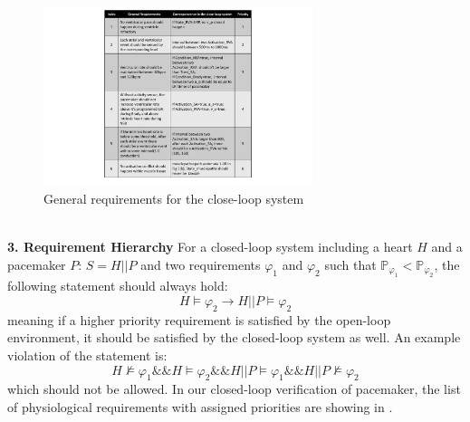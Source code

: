 \begin{figure}
	\center
	\includegraphics[width=0.7\textwidth]{figs/properties.pdf}
	\center
	\vspace{-10pt}
	\caption{General requirements for the close-loop system}
	\label{fig:properties}
\end{figure}
\noindent
\\\textbf{3. Requirement Hierarchy}
For a closed-loop system including a heart $H$ and a pacemaker $P$: $S=H || P$ and two requirements $\varphi_1$ and $\varphi_2$ such that $\mathbb{P}_{\varphi_1}<\mathbb{P}_{\varphi_2}$, the following statement should always hold:
\vspace{-5pt}
$$H\models\varphi_2\rightarrow H||P\models\varphi_2$$
\vspace{-5pt}
meaning if a higher priority requirement is satisfied by the open-loop environment, it should be satisfied by the closed-loop system as well. An example violation of the statement is:
\vspace{-5pt}
$$H\not\models\varphi_1 \&\& H\models\varphi_2 \&\& H||P\models\varphi_1 \&\& H||P\not\models\varphi_2$$
\vspace{-5pt}
which should not be allowed. In our closed-loop verification of pacemaker, the list of physiological requirements with assigned priorities are showing in .






